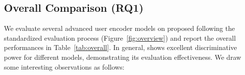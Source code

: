 

\subsection{Overall Comparison (RQ1)}

We evaluate several advanced user encoder models on proposed \name following the standardized evaluation process (Figure~\ref{fig:overview}) and report the overall performances in Table~\ref{tab:overall}. In general, \name shows excellent discriminative power for different models, demonstrating its evaluation effectiveness. We draw some interesting observations as follows:

